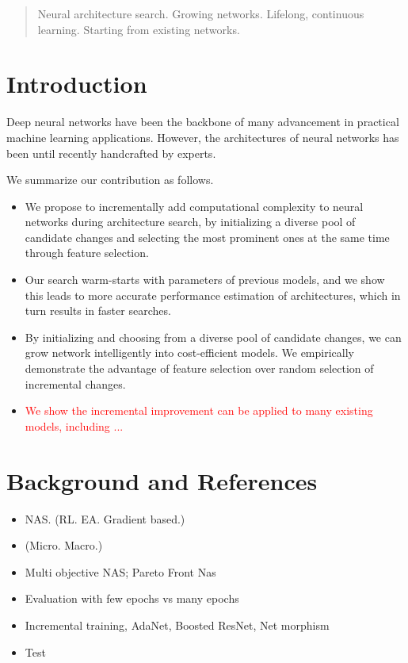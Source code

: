 \documentclass{article}
\newcommand{\todo}[1]{\textcolor{red}{#1}}
\begin{document}
\printAffiliationsAndNotice{\icmlEqualContribution} %

\begin{abstract}
Neural architecture search. Growing networks. Lifelong, continuous learning. 
Starting from existing networks.
\end{abstract}

\section{Introduction}

Deep neural networks have been the backbone of many advancement in practical machine learning applications. However, the architectures of neural networks has been until recently handcrafted by experts. 


We summarize our contribution as follows.
\begin{itemize}
\item We propose to incrementally add computational complexity to neural networks during architecture search, by initializing a diverse pool of candidate changes and selecting the most prominent ones at the same time through feature selection. 
\item Our search warm-starts with parameters of previous models, and we show this leads to more accurate performance estimation of architectures, which in turn results in faster searches.
\item By initializing and choosing from a diverse pool of candidate changes, we can grow network intelligently into cost-efficient models. We empirically demonstrate the advantage of feature selection over random selection of incremental changes. 
\item \todo{We show the incremental improvement can be applied to many existing models, including ...}  
\end{itemize}


\section{Background and References}
\begin{itemize}
    \item NAS. (RL. EA. Gradient based.) 
    \item (Micro. Macro.) 
    \item Multi objective NAS; Pareto Front Nas 
    \item Evaluation with few epochs vs many epochs
    \item Incremental training, AdaNet, Boosted ResNet, Net morphism
    
    \item Test~\cite{NAS, NASCell, Hsu2018MONASMN, Elsken2018NeuralAS, Real2018RegularizedEF, Liu2018DARTSDA, Kandasamy2018BNAS, Pham2018EfficientNA, Liu2017ProgressiveNA}
\end{itemize}
\end{document}
